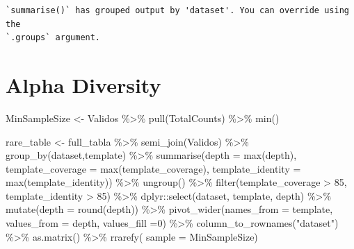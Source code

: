 \documentclass[
  letterpaper,
  DIV=11,
  numbers=noendperiod]{scrartcl}
\newenvironment{Shaded}{\begin{snugshade}}{\end{snugshade}}
\newcommand{\AttributeTok}[1]{\textcolor[rgb]{0.40,0.45,0.13}{#1}}
\newcommand{\DecValTok}[1]{\textcolor[rgb]{0.68,0.00,0.00}{#1}}
\newcommand{\FunctionTok}[1]{\textcolor[rgb]{0.28,0.35,0.67}{#1}}
\newcommand{\NormalTok}[1]{\textcolor[rgb]{0.00,0.23,0.31}{#1}}
\newcommand{\OtherTok}[1]{\textcolor[rgb]{0.00,0.23,0.31}{#1}}
\newcommand{\SpecialCharTok}[1]{\textcolor[rgb]{0.37,0.37,0.37}{#1}}
\newcommand{\StringTok}[1]{\textcolor[rgb]{0.13,0.47,0.30}{#1}}
\begin{document}
\begin{verbatim}
`summarise()` has grouped output by 'dataset'. You can override using the
`.groups` argument.
\end{verbatim}

\hypertarget{alpha-diversity}{%
\section{Alpha Diversity}\label{alpha-diversity}}

\begin{Shaded}
\begin{Highlighting}[]
\NormalTok{MinSampleSize }\OtherTok{\textless{}{-}}\NormalTok{ Validos }\SpecialCharTok{\%\textgreater{}\%} \FunctionTok{pull}\NormalTok{(TotalCounts) }\SpecialCharTok{\%\textgreater{}\%} \FunctionTok{min}\NormalTok{()}

\NormalTok{rare\_table }\OtherTok{\textless{}{-}}\NormalTok{ full\_tabla }\SpecialCharTok{\%\textgreater{}\%} 
  \FunctionTok{semi\_join}\NormalTok{(Validos) }\SpecialCharTok{\%\textgreater{}\%} 
  \FunctionTok{group\_by}\NormalTok{(dataset,template) }\SpecialCharTok{\%\textgreater{}\%} 
  \FunctionTok{summarise}\NormalTok{(}\AttributeTok{depth =} \FunctionTok{max}\NormalTok{(depth), }
            \AttributeTok{template\_coverage =} \FunctionTok{max}\NormalTok{(template\_coverage), }
            \AttributeTok{template\_identity =} \FunctionTok{max}\NormalTok{(template\_identity)) }\SpecialCharTok{\%\textgreater{}\%} 
  \FunctionTok{ungroup}\NormalTok{() }\SpecialCharTok{\%\textgreater{}\%} 
  \FunctionTok{filter}\NormalTok{(template\_coverage }\SpecialCharTok{\textgreater{}} \DecValTok{85}\NormalTok{, template\_identity }\SpecialCharTok{\textgreater{}} \DecValTok{85}\NormalTok{) }\SpecialCharTok{\%\textgreater{}\%} 
\NormalTok{  dplyr}\SpecialCharTok{::}\FunctionTok{select}\NormalTok{(dataset, template, depth) }\SpecialCharTok{\%\textgreater{}\%} 
  \FunctionTok{mutate}\NormalTok{(}\AttributeTok{depth =} \FunctionTok{round}\NormalTok{(depth)) }\SpecialCharTok{\%\textgreater{}\%} 
  \FunctionTok{pivot\_wider}\NormalTok{(}\AttributeTok{names\_from =}\NormalTok{ template, }\AttributeTok{values\_from =}\NormalTok{ depth, }\AttributeTok{values\_fill =}\DecValTok{0}\NormalTok{) }\SpecialCharTok{\%\textgreater{}\%} 
  \FunctionTok{column\_to\_rownames}\NormalTok{(}\StringTok{"dataset"}\NormalTok{) }\SpecialCharTok{\%\textgreater{}\%} 
  \FunctionTok{as.matrix}\NormalTok{() }\SpecialCharTok{\%\textgreater{}\%} 
  \FunctionTok{rrarefy}\NormalTok{( }\AttributeTok{sample =}\NormalTok{ MinSampleSize)}
\end{Highlighting}
\end{Shaded}
\end{document}

